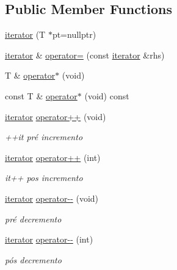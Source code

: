 \subsection*{Public Member Functions}
\begin{DoxyCompactItemize}
\item 
\hyperlink{classsc_1_1vector_1_1iterator_adcef8cb0104f9035bc98eacb4e2e29e7}{iterator} (T $\ast$pt=nullptr)
\item 
\hyperlink{classsc_1_1vector_1_1iterator}{iterator} \& \hyperlink{classsc_1_1vector_1_1iterator_a744168c87e46c6e962c30eb3ee3299ab}{operator=} (const \hyperlink{classsc_1_1vector_1_1iterator}{iterator} \&rhs)
\item 
T \& \hyperlink{classsc_1_1vector_1_1iterator_a195ce221fcaf875739014d681073eaeb}{operator$\ast$} (void)
\item 
const T \& \hyperlink{classsc_1_1vector_1_1iterator_acc1afb3186e955cd261c757dae2b587a}{operator$\ast$} (void) const
\item 
\hyperlink{classsc_1_1vector_1_1iterator}{iterator} \hyperlink{classsc_1_1vector_1_1iterator_a0579f178e03522ffa042fdbf49cbf383}{operator++} (void)
\begin{DoxyCompactList}\small\item\em ++it pré incremento \end{DoxyCompactList}\item 
\hyperlink{classsc_1_1vector_1_1iterator}{iterator} \hyperlink{classsc_1_1vector_1_1iterator_a7e58b618eb71b340b74311eda1271bc9}{operator++} (int)
\begin{DoxyCompactList}\small\item\em it++ pos incremento \end{DoxyCompactList}\item 
\hyperlink{classsc_1_1vector_1_1iterator}{iterator} \hyperlink{classsc_1_1vector_1_1iterator_a8be1d69a3f7f0d220487463a60a5efd4}{operator-\/-\/} (void)
\begin{DoxyCompactList}\small\item\em pré decremento \end{DoxyCompactList}\item 
\hyperlink{classsc_1_1vector_1_1iterator}{iterator} \hyperlink{classsc_1_1vector_1_1iterator_ab4a76691eb8ba0da9e014fa49f4cce4f}{operator-\/-\/} (int)
\begin{DoxyCompactList}\small\item\em pós decremento \end{DoxyCompactList}\item 

\end{DoxyCompactItemize}
